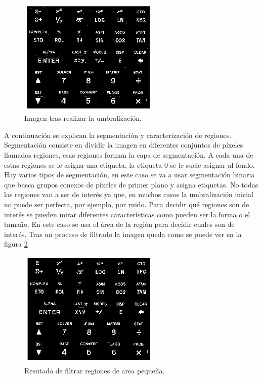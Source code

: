 \documentclass[a4paper,12pt]{report}
\begin{document}
\begin{figure}[h]
\centering
\includegraphics[width=0.6\textwidth]{imagenes/thresholding}
\caption{Imagen tras realizar la umbralización.}
\label{thresholding}
\end{figure}
A continuación se explican la segmentación y caracterización de regiones. Segmentación consiste en dividir la imagen en diferentes conjuntos de píxeles llamados regiones, esas regiones forman la capa de segmentación. A cada una de estas regiones se le asigna una etiqueta, la etiqueta 0 se le suele asignar al fondo.\\

Hay varios tipos de segmentación, en este caso se va a usar segmentación binaria que busca grupos conexos de píxeles de primer plano y asigna etiquetas. No todas las regiones van a ser de interés ya que, en muchos casos la umbralización inicial no puede ser perfecta, por ejemplo, por ruido. Para decidir qué regiones son de interés se pueden mirar diferentes características como pueden ser la forma o el tamaño. En este caso se usa el área de la región para decidir cuales son de interés. Tras un proceso de filtrado la imagen queda como se puede ver en la figura \ref{filtersmallareas}\\


\begin{figure}[h]
\centering
\includegraphics[width=0.6\textwidth]{imagenes/filtersmallareas}
\caption{Resutado de filtrar regiones de area pequeña.}
\label{filtersmallareas}
\end{figure}
\end{document}
